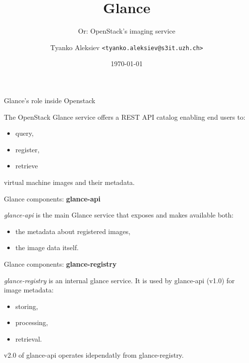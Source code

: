\documentclass[english,serif,mathserif]{beamer}
\begin{document}
\title[Short Title]{ Glance  }
\subtitle{Or: OpenStack's imaging service}

\author{ Tyanko Aleksiev \texttt{<tyanko.aleksiev@s3it.uzh.ch>}}

\date{\today}

\maketitle

\begin{frame}{Glance's role inside Openstack}

The OpenStack Glance service offers a REST API catalog enabling end users to:
\begin{itemize}
\item query,
\item register,
\item retrieve 
\end{itemize}
virtual machine images and their metadata. 

\end{frame}

\begin{frame}{Glance components: \textbf{glance-api}}

\textit{glance-api} is the main Glance service that exposes and makes available both:
 
\begin{itemize}
\item the metadata about registered images,
\item the image data itself. 
\end{itemize} 

\end{frame}

\begin{frame}{Glance components: \textbf{glance-registry}}

\textit{glance-registry} is an internal glance service. It is used 
by glance-api (v1.0) for image metadata:
 
\begin{itemize}
\item storing,
\item processing,
\item retrieval.
\end{itemize}

v2.0 of glance-api operates idependatly from glance-registry.

\end{frame}
\end{document}
